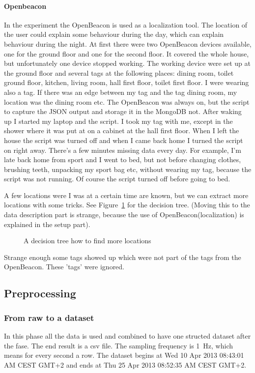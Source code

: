 			\paragraph{Openbeacon}
		 		In the experiment the OpenBeacon is used as a localization tool. The location of the user could explain some behaviour during the day, which can explain behaviour during the night. At first there were two OpenBeacon devices available, one for the ground floor and one for the second floor. It covered the whole house, but unfortunately one device stopped working. The working device were set up at the ground floor and several tags at the following places: dining room, toilet ground floor, kitchen, living room, hall first floor, toilet first floor. I were wearing also a tag. If there was an edge between my tag and the tag dining room, my location was the dining room etc. The OpenBeacon was always on, but the script to capture the JSON output and storage it in the MongoDB not. After waking up I started my laptop and the script. I took my tag with me, except in the shower where it was put at on a cabinet at the hall first floor. When I left the house the script was turned off and when I came back home I turned the script on right away. There's a few minutes missing data every day. For example, I'm late back home from sport and I went to bed, but not before changing clothes, brushing teeth, unpacking my sport bag etc, without wearing my tag, because the script was not running. Of course the script turned off before going to bed.

				
				A few locations were I was at a certain time are known, but we can extract more locations with some tricks. See Figure~\ref{fig:decisiontree} for the decision tree. (Moving this to the data description part is strange, because the use of OpenBeacon(localization) is explained in the setup part).

				\begin{figure}[h!]
					
					\caption{A decision tree how to find more locations}
					\label{fig:decisiontree}
				\end{figure}

				Strange enough some tags showed up which were not part of the tags from the OpenBeacon. These 'tags' were ignored.
				
	\subsection{Preprocessing}
		\subsubsection{From raw to a dataset}
			In this phase all the data is used and combined to have one structed dataset after the fase. The end result is a csv file. The sampling frequency is \SI{1}{\hertz}, which means for every second a row. The dataset begins at Wed 10 Apr 2013 08:43:01 AM CEST GMT+2 and ends at Thu 25 Apr 2013 08:52:35 AM CEST GMT+2. 
			
